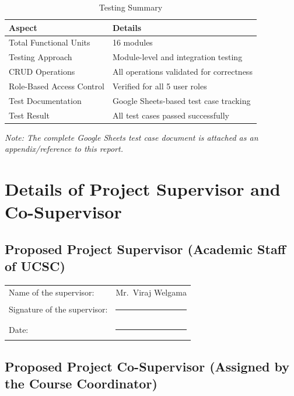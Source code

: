 \documentclass[12pt, a4paper]{report}
\begin{document}
\begin{table}[H]
\centering
\caption{Testing Summary}
\label{tab:testing-summary}
\begin{tabular}{l l}
\toprule
\textbf{Aspect} & \textbf{Details} \\
\midrule
Total Functional Units        & 16 modules \\
Testing Approach              & Module-level and integration testing \\
CRUD Operations               & All operations validated for correctness \\
Role-Based Access Control     & Verified for all 5 user roles \\
Test Documentation            & Google Sheets-based test case tracking \\
Test Result                   & All test cases passed successfully \\
\bottomrule
\end{tabular}
\end{table}

\noindent\textit{Note: The complete Google Sheets test case document is attached as an appendix/reference to this report.}

\chapter{Details of Project Supervisor and Co-Supervisor}

\section*{Proposed Project Supervisor (Academic Staff of UCSC)}

\noindent
\begin{tabular}{@{} p{6cm} p{8cm} @{}}
Name of the supervisor: & Mr.\ Viraj Welgama \\[1cm]
Signature of the supervisor: & \rule{6cm}{0.4pt} \\[1cm]
Date: & \rule{6cm}{0.4pt} \\
\end{tabular}

\vspace{1cm}

\section*{Proposed Project Co-Supervisor (Assigned by the Course Coordinator)}
\end{document}
